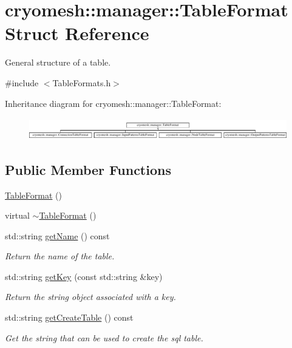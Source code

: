 \hypertarget{structcryomesh_1_1manager_1_1TableFormat}{\section{cryomesh\-:\-:manager\-:\-:\-Table\-Format \-Struct \-Reference}
\label{structcryomesh_1_1manager_1_1TableFormat}
}


\-General structure of a table.  




{\ttfamily \#include $<$\-Table\-Formats.\-h$>$}

\-Inheritance diagram for cryomesh\-:\-:manager\-:\-:\-Table\-Format\-:\begin{figure}[H]
\begin{center}
\leavevmode
\includegraphics[height=0.968858cm]{structcryomesh_1_1manager_1_1TableFormat}
\end{center}
\end{figure}
\subsection*{\-Public \-Member \-Functions}
\begin{DoxyCompactItemize}
\item 
\hyperlink{structcryomesh_1_1manager_1_1TableFormat_ab19e1f6e34a67772918360f864e40913}{\-Table\-Format} ()
\item 
virtual \hyperlink{structcryomesh_1_1manager_1_1TableFormat_a3dccdd11e7eb1ab2b7720fd8fdc6b019}{$\sim$\-Table\-Format} ()
\item 
std\-::string \hyperlink{structcryomesh_1_1manager_1_1TableFormat_a3e797d6130c6b0745a1fac799c25677a}{get\-Name} () const 
\begin{DoxyCompactList}\small\item\em \-Return the name of the table. \end{DoxyCompactList}\item 
std\-::string \hyperlink{structcryomesh_1_1manager_1_1TableFormat_a2256ce39471582b92bf7cbb6eec74d30}{get\-Key} (const std\-::string \&key)
\begin{DoxyCompactList}\small\item\em \-Return the string object associated with a key. \end{DoxyCompactList}\item 
std\-::string \hyperlink{structcryomesh_1_1manager_1_1TableFormat_a898ae0d0c5490ccdf71aec5156b10fcc}{get\-Create\-Table} () const 
\begin{DoxyCompactList}\small\item\em \-Get the string that can be used to create the sql table. \end{DoxyCompactList}\end{DoxyCompactItemize}
